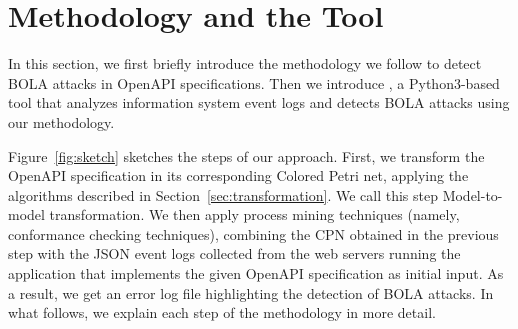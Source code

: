 \section{Methodology and the Tool {\nameTool}}
\label{sec:methodology}

In this section, we first briefly introduce the methodology we follow to detect BOLA attacks in OpenAPI specifications. Then we introduce {\nameTool}, a Python3-based tool that analyzes information system event logs and detects BOLA attacks using our methodology.


Figure~\ref{fig:sketch} sketches the steps of our approach. First, we transform the OpenAPI specification in its corresponding Colored Petri net,  applying the algorithms described in Section~\ref{sec:transformation}.  We call this step  {\sc Model-to-model transformation}. We then apply process mining techniques (namely, conformance checking techniques), combining the CPN obtained in the previous step with the JSON event logs collected from the web servers running the application that implements the given OpenAPI specification as initial input. As a result, we get an error log file highlighting the detection of BOLA attacks. In what follows, we explain each step of the methodology in more detail.

